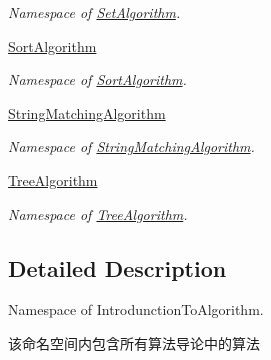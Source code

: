 \begin{DoxyCompactItemize}
\begin{DoxyCompactList}\small\item\em Namespace of \hyperlink{namespace_introduction_to_algorithm_1_1_set_algorithm}{Set\+Algorithm}. \end{DoxyCompactList}\item 
 \hyperlink{namespace_introduction_to_algorithm_1_1_sort_algorithm}{Sort\+Algorithm}
\begin{DoxyCompactList}\small\item\em Namespace of \hyperlink{namespace_introduction_to_algorithm_1_1_sort_algorithm}{Sort\+Algorithm}. \end{DoxyCompactList}\item 
 \hyperlink{namespace_introduction_to_algorithm_1_1_string_matching_algorithm}{String\+Matching\+Algorithm}
\begin{DoxyCompactList}\small\item\em Namespace of \hyperlink{namespace_introduction_to_algorithm_1_1_string_matching_algorithm}{String\+Matching\+Algorithm}. \end{DoxyCompactList}\item 
 \hyperlink{namespace_introduction_to_algorithm_1_1_tree_algorithm}{Tree\+Algorithm}
\begin{DoxyCompactList}\small\item\em Namespace of \hyperlink{namespace_introduction_to_algorithm_1_1_tree_algorithm}{Tree\+Algorithm}. \end{DoxyCompactList}\end{DoxyCompactItemize}


\subsection{Detailed Description}
Namespace of Introdunction\+To\+Algorithm. 

该命名空间内包含所有算法导论中的算法 